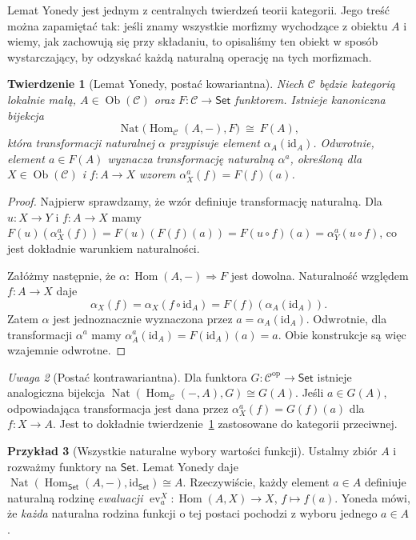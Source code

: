 \documentclass[11pt,a4paper]{article}
\numberwithin{equation}{section}
\theoremstyle{plain}
\newtheorem{twierdzenie}{Twierdzenie}[section]
\theoremstyle{definition}
\newtheorem{przyklad}[twierdzenie]{Przykład}
\theoremstyle{remark}
\newtheorem{uwaga}[twierdzenie]{Uwaga}
\newcommand{\cat}[1]{\mathsf{#1}}
\newcommand{\Set}{\cat{Set}}
\newcommand{\id}{\mathrm{id}}
\newcommand{\Hom}{\operatorname{Hom}}
\newcommand{\Ob}{\operatorname{Ob}}
\newcommand{\Nat}{\operatorname{Nat}}
\newcommand{\op}{\mathrm{op}}
\DeclareMathOperator{\ev}{ev}
\begin{document}
Lemat Yonedy jest jednym z centralnych twierdzeń teorii kategorii. Jego treść można zapamiętać tak: jeśli znamy wszystkie morfizmy wychodzące z obiektu $A$ i wiemy, jak zachowują się przy składaniu, to opisaliśmy ten obiekt w sposób wystarczający, by odzyskać każdą naturalną operację na tych morfizmach.

\begin{twierdzenie}[Lemat Yonedy, postać kowariantna]\label{tw:yoneda}
Niech $\mathcal C$ będzie kategorią lokalnie małą, $A\in\Ob(\mathcal C)$ oraz $F:\mathcal C\to\Set$ funktorem. Istnieje kanoniczna bijekcja
\[
\Nat\bigl(\Hom_{\mathcal C}(A,-),F\bigr)\ \cong\ F(A),
\]
która transformacji naturalnej $\alpha$ przypisuje element $\alpha_A(\id_A)$. Odwrotnie, element $a\in F(A)$ wyznacza transformację naturalną $\alpha^a$, określoną dla $X\in\Ob(\mathcal C)$ i $f:A\to X$ wzorem $\alpha^a_X(f)=F(f)(a)$.
\end{twierdzenie}
\begin{proof}
Najpierw sprawdzamy, że wzór definiuje transformację naturalną. Dla $u:X\to Y$ i $f:A\to X$ mamy $F(u)(\alpha^a_X(f))=F(u)(F(f)(a))=F(u\circ f)(a)=\alpha^a_Y(u\circ f)$, co jest dokładnie warunkiem naturalności.

Załóżmy następnie, że $\alpha:\Hom(A,-)\Rightarrow F$ jest dowolna. Naturalność względem $f:A\to X$ daje
\[
\alpha_X(f)=\alpha_X(f\circ\id_A)=F(f)(\alpha_A(\id_A)).
\]
Zatem $\alpha$ jest jednoznacznie wyznaczona przez $a=\alpha_A(\id_A)$. Odwrotnie, dla transformacji $\alpha^a$ mamy $\alpha^a_A(\id_A)=F(\id_A)(a)=a$. Obie konstrukcje są więc wzajemnie odwrotne.
\end{proof}

\begin{uwaga}[Postać kontrawariantna]
Dla funktora $G:\mathcal C^{\op}\to\Set$ istnieje analogiczna bijekcja $\Nat(\Hom_{\mathcal C}(-,A),G)\cong G(A)$. Jeśli $a\in G(A)$, odpowiadająca transformacja jest dana przez $\alpha^a_X(f)=G(f)(a)$ dla $f:X\to A$. Jest to dokładnie twierdzenie~\ref{tw:yoneda} zastosowane do kategorii przeciwnej.
\end{uwaga}

\begin{przyklad}[Wszystkie naturalne wybory wartości funkcji]
Ustalmy zbiór $A$ i rozważmy funktory na $\Set$. Lemat Yonedy daje $\Nat(\Hom_{\Set}(A,-),\id_{\Set})\cong A$. Rzeczywiście, każdy element $a\in A$ definiuje naturalną rodzinę \emph{ewaluacji} $\ev_a^X:\Hom(A,X)\to X$, $f\mapsto f(a)$. Yoneda mówi, że \emph{każda} naturalna rodzina funkcji o tej postaci pochodzi z wyboru jednego $a\in A$.
\end{przyklad}
\end{document}
